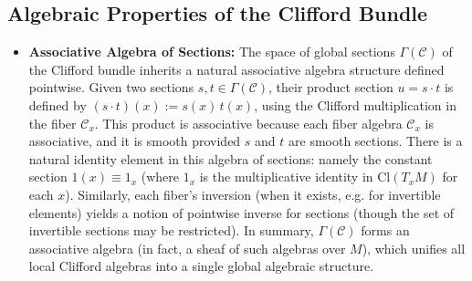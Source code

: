 \documentclass[12pt]{article}
\newcommand{\Cl}{\mathrm{Cl}}
\begin{document}
\subsection{Algebraic Properties of the Clifford Bundle}
\begin{itemize}
    \item \textbf{Associative Algebra of Sections:} The space of global sections $\Gamma(\mathcal{C})$ of the Clifford bundle inherits a natural associative algebra structure defined pointwise. Given two sections $s, t \in \Gamma(\mathcal{C})$, their product section $u = s \cdot t$ is defined by $(s \cdot t)(x) := s(x)\,t(x)$, using the Clifford multiplication in the fiber $\mathcal{C}_x$. This product is associative because each fiber algebra $\mathcal{C}_x$ is associative, and it is smooth provided $s$ and $t$ are smooth sections. There is a natural identity element in this algebra of sections: namely the constant section $1(x) \equiv 1_{x}$ (where $1_x$ is the multiplicative identity in $\Cl(T_xM)$ for each $x$). Similarly, each fiber’s inversion (when it exists, e.g. for invertible elements) yields a notion of pointwise inverse for sections (though the set of invertible sections may be restricted). In summary, $\Gamma(\mathcal{C})$ forms an associative algebra (in fact, a sheaf of such algebras over $M$), which unifies all local Clifford algebras into a single global algebraic structure.


\end{itemize}
\end{document}
